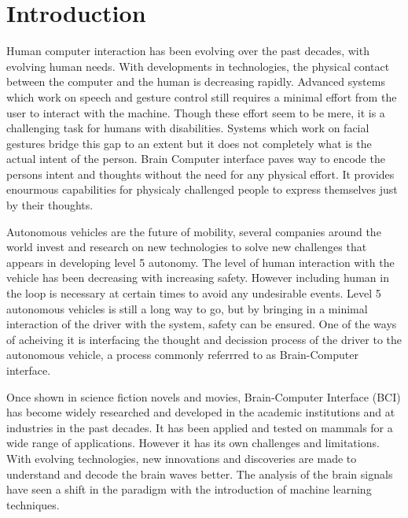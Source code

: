 \section*{Introduction}
Human computer interaction has been evolving over the past decades, with evolving human needs. With developments in technologies, the physical 
contact between the computer and the human is decreasing rapidly. Advanced systems which work on speech and gesture control still requires a minimal
effort from the user to interact with the machine. Though these effort seem to be mere, it is a challenging task for humans with disabilities. 
Systems which work on facial gestures bridge this gap to an extent but it does not completely what is the actual intent of the person. Brain Computer
interface paves way to encode the persons intent and thoughts without the need for any physical effort. It provides enourmous capabilities for 
physicaly challenged people to express themselves just by their thoughts. 

Autonomous vehicles are the future of mobility, several companies around the world invest and research on new technologies to solve new challenges 
that appears in developing level 5 autonomy. The level of human interaction with the vehicle has been decreasing with increasing safety. However
including human in the loop is necessary at certain times to avoid any undesirable events. Level  5 autonomous vehicles is still a long way to go, 
but by bringing in a minimal interaction of the driver with the system, safety can be ensured. One of the ways of acheiving it is interfacing the
thought and decission process of the driver to the autonomous vehicle, a process commonly referrred to as Brain-Computer interface. 

Once shown in science fiction novels and movies, Brain-Computer Interface (BCI) has become widely researched and developed in the academic institutions 
and at industries in the past decades. It has been applied and tested on mammals for a wide range of applications. However it has its own challenges
and limitations. With evolving technologies, new innovations and discoveries are made to understand and decode the brain waves better. The analysis
of the brain signals have seen a shift in the paradigm with the introduction of machine learning techniques. 

